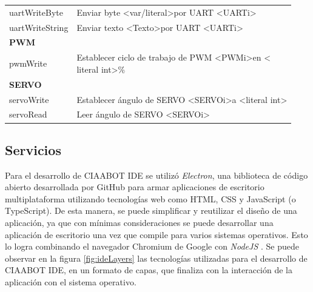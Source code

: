 \begin{longtable}[c]{ll}
uartWriteByte                                 & Enviar byte \textless var/literal\textgreater por UART \textless UARTi\textgreater                                                                                                  \\
uartWriteString                               & Enviar texto \textless Texto\textgreater por UART \textless UARTi\textgreater                                                                                                       \\ \hline
\textbf{PWM}                                  &                                                                                                                                                                                     \\ \hline
pwmWrite                                      & \makecell[ll]{Establecer ciclo de trabajo de PWM \textless PWMi\textgreater en \textless \\ literal int\textgreater \%}                                                                               \\ \hline
\textbf{SERVO}                                &                                                                                                                                                                                     \\ \hline
servoWrite                                    & Establecer ángulo de SERVO \textless SERVOi\textgreater a \textless literal int\textgreater                                                                                         \\
servoRead                                     & Leer ángulo de SERVO \textless SERVOi\textgreater                                                                                                                                  
\end{longtable}

\subsection{Servicios}
Para el desarrollo de CIAABOT IDE se utilizó \emph{Electron}\citep{electron}, una biblioteca de código abierto desarrollada por GitHub para armar aplicaciones de escritorio multiplataforma utilizando tecnologías web como HTML, CSS y JavaScript (o TypeScript). De esta manera, se puede simplificar y reutilizar el diseño de una aplicación, ya que con mínimas consideraciones se puede desarrollar una aplicación de escritorio una vez que compile para varios sistemas operativos. Esto lo logra combinando el navegador Chromium de Google con \emph{NodeJS} \citep{nodejs}. Se puede observar en la figura \ref{fig:ideLayers} las tecnologías utilizadas para el desarrollo de CIAABOT IDE, en un formato de capas, que finaliza con la interacción de la aplicación con el sistema operativo.

